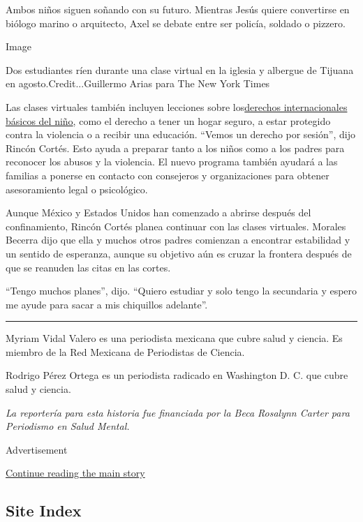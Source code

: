 Ambos niños siguen soñando con su futuro. Mientras Jesús quiere
convertirse en biólogo marino o arquitecto, Axel se debate entre ser
policía, soldado o pizzero.

Image

Dos estudiantes ríen durante una clase virtual en la iglesia y albergue
de Tijuana en agosto.Credit...Guillermo Arias para The New York Times

Las clases virtuales también incluyen lecciones sobre
los\href{https://www.unicef.org/es/convencion-derechos-nino/convencion-version-ninos}{derechos
internacionales básicos del niño}, como el derecho a tener un hogar
seguro, a estar protegido contra la violencia o a recibir una educación.
``Vemos un derecho por sesión'', dijo Rincón Cortés. Esto ayuda a
preparar tanto a los niños como a los padres para reconocer los abusos y
la violencia. El nuevo programa también ayudará a las familias a ponerse
en contacto con consejeros y organizaciones para obtener asesoramiento
legal o psicológico.

Aunque México y Estados Unidos han comenzado a abrirse después del
confinamiento, Rincón Cortés planea continuar con las clases virtuales.
Morales Becerra dijo que ella y muchos otros padres comienzan a
encontrar estabilidad y un sentido de esperanza, aunque su objetivo aún
es cruzar la frontera después de que se reanuden las citas en las
cortes.

``Tengo muchos planes'', dijo. ``Quiero estudiar y solo tengo la
secundaria y espero me ayude para sacar a mis chiquillos adelante''.

\begin{center}\rule{0.5\linewidth}{\linethickness}\end{center}

Myriam Vidal Valero es una periodista mexicana que cubre salud y
ciencia. Es miembro de la Red Mexicana de Periodistas de Ciencia.

Rodrigo Pérez Ortega es un periodista radicado en Washington D. C. que
cubre salud y ciencia.

\emph{La reportería para esta historia fue financiada por la Beca
Rosalynn Carter para Periodismo en Salud Mental.}

Advertisement

\protect\hyperlink{after-bottom}{Continue reading the main story}

\hypertarget{site-index}{%
\subsection{Site Index}\label{site-index}}

